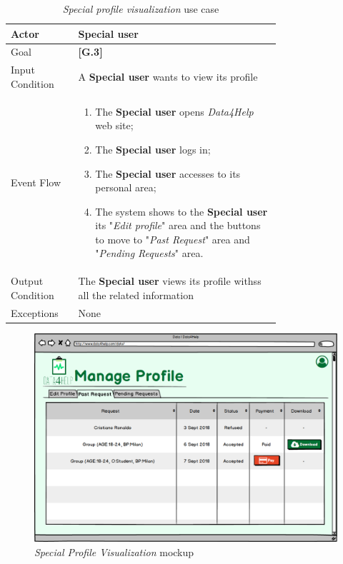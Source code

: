 \begin{center}
\begin{table}[H]
\begin{tabular}{ | l | p{0.75\linewidth} | }
  \hline
    Actor & \textbf{Special user} \\ \hline
    Goal & \textbf{[G.3]} \\ \hline
    Input Condition & A \textbf{Special user} wants to view its profile\\ \hline
    Event Flow & \begin{minipage}[t]{0.7\textwidth}
      \begin{enumerate}
        \item The \textbf{Special user } opens \textit{Data4Help} web site;
        \item The \textbf{Special user} logs in;
        \item The \textbf{Special user} accesses to its personal area;
        \item The system shows to the \textbf{Special user} its "\textit{Edit profile}" area and the buttons to move to "\textit{Past Request}" area and "\textit{Pending Requests}" area.
      \end{enumerate}
    \smallskip
  \end{minipage} \\ \hline
  Output Condition & The \textbf{Special user} views its profile withss all the related information\\ \hline
  Exceptions & None \\ \hline
\end{tabular}
\caption{\textit{Special profile visualization} use case}
\label{table:specialProfileVisualizationTable}
\end{table}
\end{center}

\begin{figure}[H]
\begin{center}
  \includegraphics[width=\textwidth]{img/mockup/Searched.png}
  \hspace{0.05\linewidth}
  \centering
  \caption{\textit{Special Profile Visualization} mockup}
  \label{img:specialProfileVisualizationMockup}
\end{center}
\end{figure}
